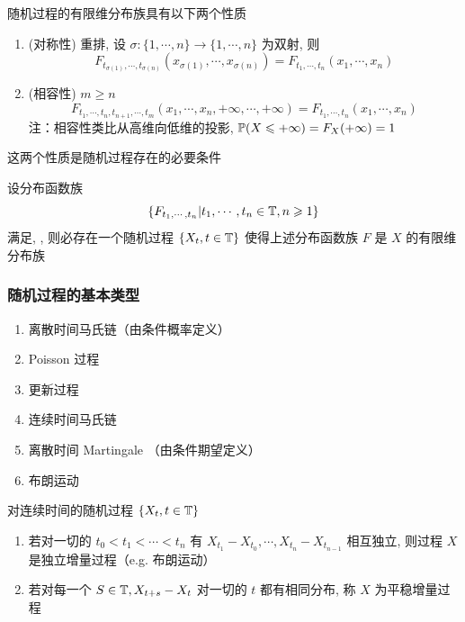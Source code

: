 \begin{property}
随机过程的有限维分布族具有以下两个性质
\begin{enumerate}
    \item (对称性) 重排, 设 $\sigma:\{1,\cdots,n\}\rightarrow \{1,\cdots,n\}$ 为双射, 则
    \[
    F_{t_{\sigma(1)}, \cdots,t_{\sigma(n)}}(x_{\sigma(1)},\cdots,x_{\sigma(n)})=F_{t_1,\cdots,t_n}(x_1,\cdots,x_n)
    \]
    \item (相容性) $m\geq n$
    \[
    F_{t_1,\cdots,t_n,t_{n+1},\cdots,t_m}(x_1,\cdots,x_n,+\infty,\cdots,+\infty)=F_{t_1,\cdots,t_n}(x_1,\cdots,x_n)
    \]
    注：相容性类比从高维向低维的投影, $\mathbb{P}(X\leqslant +\infty)=F_X(+\infty)=1$
\end{enumerate}
这两个性质是随机过程存在的必要条件
\end{property}

\begin{theorem}[Kolmogorov定理]\label{thm:Kolmogorov}
    设分布函数族
    \[
    \{F_{t_1,\cdots,t_n}|t_1,\cdots,t_n\in \mathbb{T},n\geqslant 1\}
    \]
    满足, , 则必存在一个随机过程 $\{X_t,t\in \mathbb{T}\}$ 使得上述分布函数族 $F$ 是 $X$ 的有限维分布族
\end{theorem}

\subsubsection{随机过程的基本类型}

\begin{enumerate}
    \item 离散时间马氏链（由条件概率定义）
    \item Poisson 过程
    \item 更新过程
    \item 连续时间马氏链
    \item 离散时间 Martingale （由条件期望定义）
    \item 布朗运动
\end{enumerate}

\begin{definition}
    对连续时间的随机过程 $\{X_t,t\in \mathbb{T}\}$
    \begin{enumerate}
        \item 若对一切的 $t_0<t_1<\cdots<t_n$ 有 $X_{t_1}-X_{t_0},\cdots,X_{t_n}-X_{t_{n-1}}$ 相互独立, 则过程 $X$ 是独立增量过程（e.g. 布朗运动）
        \item 若对每一个 $S\in \mathbb{T}, X_{t+s}-X_t$ 对一切的 $t$ 都有相同分布, 称 $X$ 为平稳增量过程
    \end{enumerate}
\end{definition}
